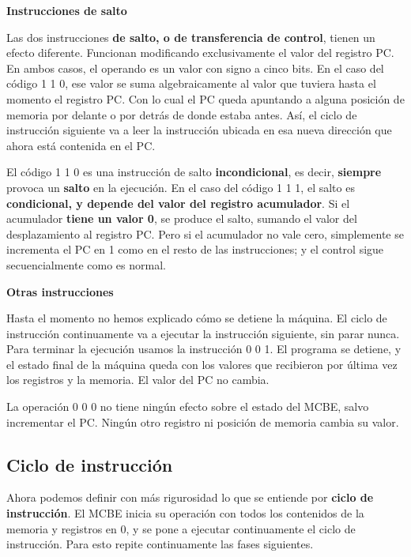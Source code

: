\documentclass[spanish,A4,]{article}
\begin{document}
\textbf{Instrucciones de salto}

Las dos instrucciones \textbf{de salto, o de transferencia de control},
tienen un efecto diferente. Funcionan modificando exclusivamente el
valor del registro PC. En ambos casos, el operando es un valor con signo
a cinco bits. En el caso del código 1 1 0, ese valor se suma
algebraicamente al valor que tuviera hasta el momento el registro PC.
Con lo cual el PC queda apuntando a alguna posición de memoria por
delante o por detrás de donde estaba antes. Así, el ciclo de instrucción
siguiente va a leer la instrucción ubicada en esa nueva dirección que
ahora está contenida en el PC.

El código 1 1 0 es una instrucción de salto \textbf{incondicional}, es
decir, \textbf{siempre} provoca un \textbf{salto} en la ejecución. En el
caso del código 1 1 1, el salto es \textbf{condicional, y depende del
valor del registro acumulador}. Si el acumulador \textbf{tiene un valor
0}, se produce el salto, sumando el valor del desplazamiento al registro
PC. Pero si el acumulador no vale cero, simplemente se incrementa el PC
en 1 como en el resto de las instrucciones; y el control sigue
secuencialmente como es normal.

\textbf{Otras instrucciones}

Hasta el momento no hemos explicado cómo se detiene la máquina. El ciclo
de instrucción continuamente va a ejecutar la instrucción siguiente, sin
parar nunca. Para terminar la ejecución usamos la instrucción 0 0 1. El
programa se detiene, y el estado final de la máquina queda con los
valores que recibieron por última vez los registros y la memoria. El
valor del PC no cambia.

La operación 0 0 0 no tiene ningún efecto sobre el estado del MCBE, salvo
incrementar el PC. Ningún otro registro ni posición de memoria cambia su
valor.

\subsection{Ciclo de instrucción}\label{ciclo-de-instrucciuxf3n}

Ahora podemos definir con más rigurosidad lo que se entiende por
\textbf{ciclo de instrucción}. El MCBE inicia su operación con todos los
contenidos de la memoria y registros en 0, y se pone a ejecutar
continuamente el ciclo de instrucción. Para esto repite continuamente
las fases siguientes.
\end{document}
